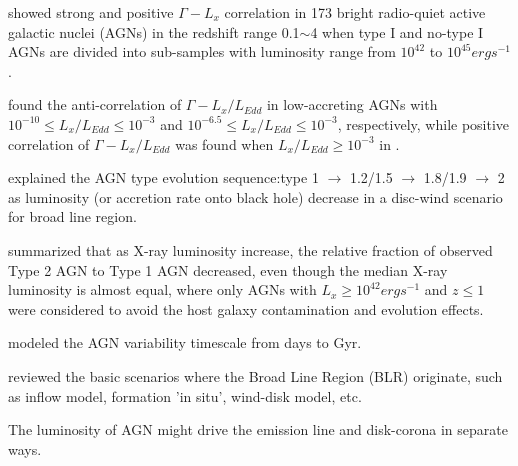 \citet{2008AJ....135.1505S} showed strong and positive $\Gamma-L_x$ correlation in 173 bright radio-quiet active galactic nuclei (AGNs) in the redshift range 0.1$\sim$4 when type I and no-type I AGNs are divided into sub-samples with luminosity range from $10^{42}$ to $10^{45} erg s^{-1}$.



\citet{2014MNRAS.443...72J,2015MNRAS.447.1692Y} found the anti-correlation of $\Gamma-L_x/L_{Edd}$ in low-accreting AGNs with $10^{-10}\leq L_x/L_{Edd} \leq 10^{-3}$ and $10^{-6.5}\leq L_x/L_{Edd} \leq 10^{-3}$, respectively, while positive correlation of $\Gamma-L_x/L_{Edd}$ was found when $L_x/L_{Edd} \geq 10^{-3}$ in \citet{2015MNRAS.447.1692Y}.

\citet{2014MNRAS.438.3340E} explained the AGN type evolution sequence:type 1 $\to$ 1.2/1.5 $\to$ 1.8/1.9 $\to$ 2 as luminosity (or accretion rate onto black hole) decrease in a disc-wind scenario for broad line region. 



\citet{2017ApJ...841L..18M} summarized that as X-ray luminosity increase, the relative fraction of observed Type 2 AGN to Type 1 AGN decreased, even though the median X-ray luminosity is almost equal, where only AGNs with $L_x \geq 10^{42} erg s^{-1}$ and $z \leq 1$ were considered to avoid the host galaxy contamination and evolution effects.

\citet{2018MNRAS.476L..34S} modeled the AGN variability timescale from days to Gyr.

\citet{2019arXiv190800742C} reviewed the basic scenarios where the Broad Line Region (BLR) originate, such as inflow model, formation 'in situ', wind-disk model, etc. 


The luminosity of AGN might drive the emission line and disk-corona in separate ways.